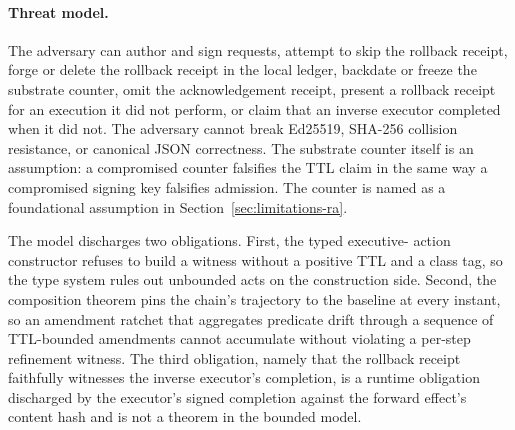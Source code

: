 \paragraph{Threat model.}
The adversary can author and sign requests, attempt to skip the
rollback receipt, forge or delete the rollback receipt in the local
ledger, backdate or freeze the substrate counter, omit the
acknowledgement receipt, present a rollback receipt for an execution
it did not perform, or claim that an inverse executor completed when
it did not. The adversary cannot break Ed25519, SHA-256 collision
resistance, or canonical JSON correctness. The substrate counter
itself is an assumption: a compromised counter falsifies the TTL claim
in the same way a compromised signing key falsifies admission. The
counter is named as a foundational assumption in
Section~\ref{sec:limitations-ra}.

The model discharges two obligations. First, the typed executive-
action constructor refuses to build a witness without a positive TTL
and a class tag, so the type system rules out unbounded acts on the
construction side. Second, the composition theorem pins the chain's
trajectory to the baseline at every instant, so an amendment ratchet
that aggregates predicate drift through a sequence of TTL-bounded
amendments cannot accumulate without violating a per-step refinement
witness. The third obligation, namely that the rollback receipt
faithfully witnesses the inverse executor's completion, is a runtime
obligation discharged by the executor's signed completion against the
forward effect's content hash and is not a theorem in the bounded
model.

